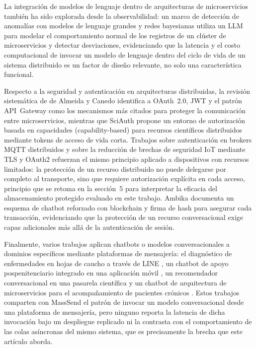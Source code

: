 La integración de modelos de lenguaje dentro de arquitecturas de
microservicios también ha sido explorada desde la observabilidad: un marco de
detección de anomalías con modelos de lenguaje grandes y redes bayesianas
\cite{ref9} utiliza un LLM para modelar el comportamiento normal de los
registros de un clúster de microservicios y detectar desviaciones,
evidenciando que la latencia y el costo computacional de invocar un modelo de
lenguaje dentro del ciclo de vida de un sistema distribuido es un factor de
diseño relevante, no solo una característica funcional.

Respecto a la seguridad y autenticación en arquitecturas distribuidas, la
revisión sistemática de de Almeida y Canedo \cite{ref12} identifica a
OAuth~2.0, JWT y el patrón API~Gateway como los mecanismos más citados para
proteger la comunicación entre microservicios, mientras que SciAuth
\cite{ref11} propone un entorno de autorización basada en capacidades
(capability-based) para recursos científicos distribuidos mediante tokens de
acceso de vida corta. Trabajos sobre autenticación en brokers MQTT
distribuidos \cite{ref13} y sobre la reducción de brechas de seguridad IoT
mediante TLS y OAuth2 \cite{ref14} refuerzan el mismo principio aplicado a
dispositivos con recursos limitados: la protección de un recurso distribuido
no puede delegarse por completo al transporte, sino que requiere autorización
explícita en cada acceso, principio que se retoma en la sección~5 para
interpretar la eficacia del almacenamiento protegido evaluado en este
trabajo. Ambika \cite{ref10} documenta un esquema de chatbot reforzado con
blockchain y firma de hash para asegurar cada transacción, evidenciando que
la protección de un recurso conversacional exige capas adicionales más allá
de la autenticación de sesión.

Finalmente, varios trabajos aplican chatbots o modelos conversacionales a
dominios específicos mediante plataformas de mensajería: el diagnóstico de
enfermedades en hojas de caucho a través de LINE \cite{ref15}, un chatbot de
apoyo pospenitenciario integrado en una aplicación móvil \cite{ref16}, un
recomendador conversacional en una pasarela científica \cite{ref17} y un
chatbot de arquitectura de microservicios para el acompañamiento de pacientes
crónicos \cite{ref18}. Estos trabajos comparten con MassSend el patrón de
invocar un modelo conversacional desde una plataforma de mensajería, pero
ninguno reporta la latencia de dicha invocación bajo un despliegue replicado
ni la contrasta con el comportamiento de las colas asíncronas del mismo
sistema, que es precisamente la brecha que este artículo aborda.

